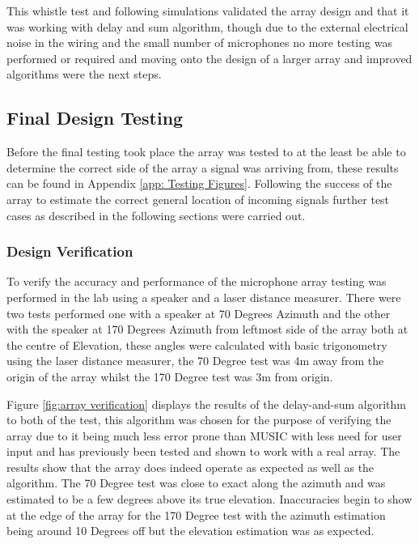 \documentclass{UoNMCHA}
\numberwithin{equation}{section}
\begin{document}
    This whistle test and following simulations validated the array design and that it was working with delay and sum algorithm, though due to the external electrical noise in the wiring and the small number of microphones no more testing was performed or required and moving onto the design of a larger array and improved algorithms were the next steps.
    
\newpage
\subsection{Final Design Testing} \label{sec:Second Array Testing}
    Before the final testing took place the array was tested to at the least be able to determine the correct side of the array a signal was arriving from, these results can be found in Appendix \ref{app: Testing Figures}. Following the success of the array to estimate the correct general location of incoming signals further test cases as described in the following sections were carried out.
\subsubsection{Design Verification} \label{sec:Design Verification Testing}
    To verify the accuracy and performance of the microphone array testing was performed in the lab using a speaker and a laser distance measurer. There were two tests performed one with a speaker at 70 Degrees Azimuth and the other with the speaker at 170 Degrees Azimuth from leftmost side of the array both at the centre of Elevation, these angles were calculated with basic trigonometry using the laser distance measurer, the 70 Degree test was 4m away from the origin of the array whilst the 170 Degree test was 3m from origin.

    Figure \ref{fig:array verification} displays the results of the delay-and-sum algorithm to both of the test, this algorithm was chosen for the purpose of verifying the array due to it being much less error prone than MUSIC with less need for user input and has previously been tested and shown to work with a real array. The results show that the array does indeed operate as expected as well as the algorithm. The 70 Degree test was close to exact along the azimuth and was estimated to be a few degrees above its true elevation. Inaccuracies begin to show at the edge of the array for the 170 Degree test with the azimuth estimation being around 10 Degrees off but the elevation estimation was as expected.
    
\end{document}
